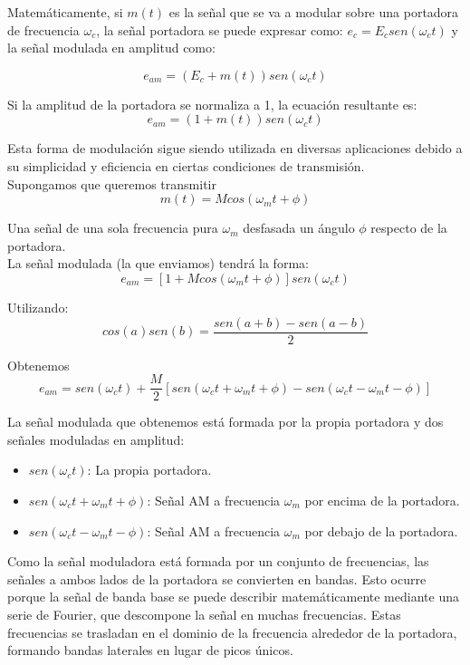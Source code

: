 Matemáticamente, si \( m(t) \) es la señal que se va a modular sobre una portadora de frecuencia \( \omega_c \), la señal portadora se puede expresar como: \(e_c = E_c sen(\omega_c t)\) y la señal modulada en amplitud como:

\begin{definicion}
\begin{equation}
e_{am} = (E_c + m(t)) sen(\omega_c t)
\end{equation}
\end{definicion}



Si la amplitud de la portadora se normaliza a 1, la ecuación resultante es:
\[
e_{am} = (1 + m(t)) sen(\omega_c t)
\]

Esta forma de modulación sigue siendo utilizada en diversas aplicaciones debido a su simplicidad y eficiencia en ciertas condiciones de transmisión.\\

Supongamos que queremos transmitir  
    \[
    m(t) = M cos(\omega_m t + \phi)
    \]
    
Una señal de una sola frecuencia pura \(\omega_m\) desfasada un ángulo \(\phi\) respecto de la portadora.\\

La señal modulada (la que enviamos) tendrá la forma:
    \[
    e_{am} = [1 + M cos(\omega_m t + \phi)] sen(\omega_c t)
    \]

Utilizando:
    \[
    cos(a) sen(b) = \frac{sen(a + b) - sen(a - b)}{2}
    \]

Obtenemos
    \[
    e_{am} = sen(\omega_c t) + \frac{M}{2} [sen(\omega_c t + \omega_m t + \phi) - sen(\omega_c t - \omega_m t - \phi)]
    \]

La señal modulada que obtenemos está formada por la propia portadora y dos señales moduladas en amplitud:
    \begin{itemize}
        \item \(sen(\omega_c t)\): La propia portadora.
        \item \(sen(\omega_c t + \omega_m t + \phi)\): Señal AM a frecuencia \(\omega_m\) por encima de la portadora.
        \item \(sen(\omega_c t - \omega_m t - \phi)\): Señal AM a frecuencia \(\omega_m\) por debajo de la portadora.\\
    \end{itemize}

Como la señal moduladora está formada por un conjunto de frecuencias, las señales a ambos lados de la portadora se convierten en bandas.  Esto ocurre porque la señal de banda base se puede describir matemáticamente mediante una serie de Fourier, que descompone la señal en muchas frecuencias. Estas frecuencias se trasladan en el dominio de la frecuencia alrededor de la portadora, formando bandas laterales en lugar de picos únicos.


